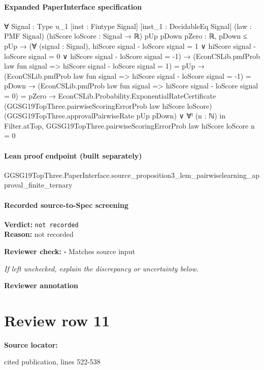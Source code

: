 \documentclass[10pt]{article}
\newcommand{\reviewerbox}{%
  \par\noindent\fbox{\parbox{0.96\linewidth}{\rule{0pt}{0.38in}}}\par
}
\newcommand{\reviewmatch}[1]{%
  \par\noindent\textbf{Reviewer check:} $\square$\; #1\par
  \noindent\emph{If left unchecked, explain the discrepancy or uncertainty below.}\par
}
\begin{document}
\paragraph{Expanded PaperInterface specification}
\begin{ReviewVerbatim}
∀ {Signal : Type u_1} [inst : Fintype Signal] [inst_1 : DecidableEq Signal] (law : PMF Signal)
  (hiScore loScore : Signal → ℝ) {pUp pDown pZero : ℝ},
  pDown ≤ pUp →
    (∀ (signal : Signal),
        hiScore signal - loScore signal = 1 ∨
          hiScore signal - loScore signal = 0 ∨ hiScore signal - loScore signal = -1) →
      (EconCSLib.pmfProb law fun signal => hiScore signal - loScore signal = 1) = pUp →
        (EconCSLib.pmfProb law fun signal => hiScore signal - loScore signal = -1) = pDown →
          (EconCSLib.pmfProb law fun signal => hiScore signal - loScore signal = 0) = pZero →
            EconCSLib.Probability.ExponentialRateCertificate
                (GGSG19TopThree.pairwiseScoringErrorProb law hiScore loScore)
                (GGSG19TopThree.approvalPairwiseRate pUp pDown) ∨
              ∀ᶠ (n : ℕ) in Filter.atTop, GGSG19TopThree.pairwiseScoringErrorProb law hiScore loScore n = 0
\end{ReviewVerbatim}

\paragraph{Lean proof endpoint (built separately)}\begin{ReviewVerbatim}
GGSG19TopThree.PaperInterface.source_proposition3_lem_pairwiselearning_approval_finite_ternary
\end{ReviewVerbatim}

\paragraph{Recorded source-to-Spec screening}
\textbf{Verdict:} \texttt{not recorded}
\\
\textbf{Reason:} not recorded
\reviewmatch{Matches source input}
\noindent\textbf{Reviewer annotation}\par
\reviewerbox
\clearpage
\hypertarget{source-claim-2576e5b507810949}{}
\section*{Review row 11}
\textbf{Source locator:} {\footnotesize\raggedright cited publication, lines 522-\allowbreak{}538\par}
\end{document}
